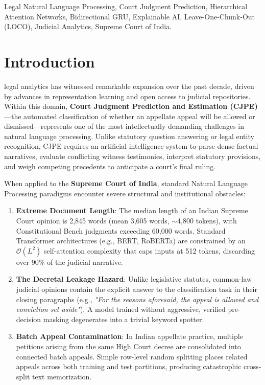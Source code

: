 \documentclass[journal,10pt,twocolumn]{IEEEtran}
\begin{document}
\begin{IEEEkeywords}
Legal Natural Language Processing, Court Judgment Prediction, Hierarchical Attention Networks, Bidirectional GRU, Explainable AI, Leave-One-Chunk-Out (LOCO), Judicial Analytics, Supreme Court of India.
\end{IEEEkeywords}

\section{Introduction}
 legal analytics has witnessed remarkable expansion over the past decade, driven by advances in representation learning and open access to judicial repositories. Within this domain, \textbf{Court Judgment Prediction and Estimation (CJPE)}—the automated classification of whether an appellate appeal will be allowed or dismissed—represents one of the most intellectually demanding challenges in natural language processing. Unlike statutory question answering or legal entity recognition, CJPE requires an artificial intelligence system to parse dense factual narratives, evaluate conflicting witness testimonies, interpret statutory provisions, and weigh competing precedents to anticipate a court's final ruling.

When applied to the \textbf{Supreme Court of India}, standard Natural Language Processing paradigms encounter severe structural and institutional obstacles:
\begin{enumerate}
    \item \textbf{Extreme Document Length}: The median length of an Indian Supreme Court opinion is 2,845 words (mean 3,605 words, $\sim$4,800 tokens), with Constitutional Bench judgments exceeding 60,000 words. Standard Transformer architectures (e.g., BERT, RoBERTa) are constrained by an $\mathcal{O}(L^2)$ self-attention complexity that caps inputs at 512 tokens, discarding over 90\% of the judicial narrative.
    \item \textbf{The Decretal Leakage Hazard}: Unlike legislative statutes, common-law judicial opinions contain the explicit answer to the classification task in their closing paragraphs (e.g., \textit{"For the reasons aforesaid, the appeal is allowed and conviction set aside"}). A model trained without aggressive, verified pre-decision masking degenerates into a trivial keyword spotter.
    \item \textbf{Batch Appeal Contamination}: In Indian appellate practice, multiple petitions arising from the same High Court decree are consolidated into connected batch appeals. Simple row-level random splitting places related appeals across both training and test partitions, producing catastrophic cross-split text memorization.
\end{enumerate}
\end{document}
